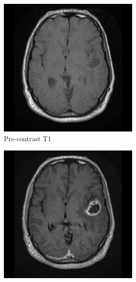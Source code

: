 \begin{subappendices}
\begin{figure}
    \begin{subfigure}[b]{0.88\textwidth}
        \centering
        \hfill
        \begin{subfigure}[b]{0.24\textwidth}
        \includegraphics[width=\textwidth]{Figures/TCGA-06-0238_T1.png}
        \caption*{Pre-contrast \acrshort{T1}}
        \end{subfigure}
        \hfill
        \begin{subfigure}[b]{0.24\textwidth}
        \includegraphics[width=\textwidth]{Figures/TCGA-06-0238_T1GD.png}

\end{subfigure}
\end{subfigure}
\end{figure}
\end{subappendices}

